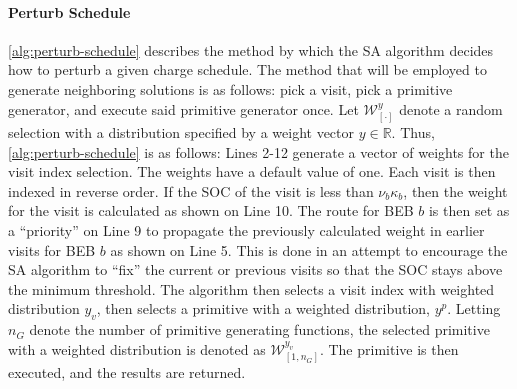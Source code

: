\documentclass[energies,article,submit,moreauthors]{Definitions/mdpi}
\newcommand{\W}{\mathcal{W}}                %
\begin{document}
\paragraph{Perturb Schedule}
\label{sec:sa-tweak-schedule}
\ref{alg:perturb-schedule} describes the method by which the SA algorithm decides how to perturb a given charge
schedule. The method that will be employed to generate neighboring solutions is as follows: pick a visit, pick a
primitive generator, and execute said primitive generator once. Let \(\W^y_{[\cdot]}\) denote a random selection with a
distribution specified by a weight vector \(y \in \mathbb{R}\). Thus, \ref{alg:perturb-schedule} is as follows: Lines 2-12 generate a
vector of weights for the visit index selection. The weights have a default value of one. Each visit is then indexed in
reverse order. If the SOC of the visit is less than \(\nu_b \kappa_b\), then the weight for the visit is calculated as shown on
Line 10. The route for BEB \(b\) is then set as a ``priority'' on Line 9 to propagate the previously calculated weight in
earlier visits for BEB \(b\) as shown on Line 5. This is done in an attempt to encourage the SA algorithm to ``fix'' the
current or previous visits so that the SOC stays above the minimum threshold. The algorithm then selects a visit index
with weighted distribution \(y_v\), then selects a primitive with a weighted distribution, \(y^p\). Letting \(n_G\) denote the
number of primitive generating functions, the selected primitive with a weighted distribution is denoted as \(\W^{y_v}_{[1,
n_G]}\). The primitive is then executed, and the results are returned.
\end{document}
